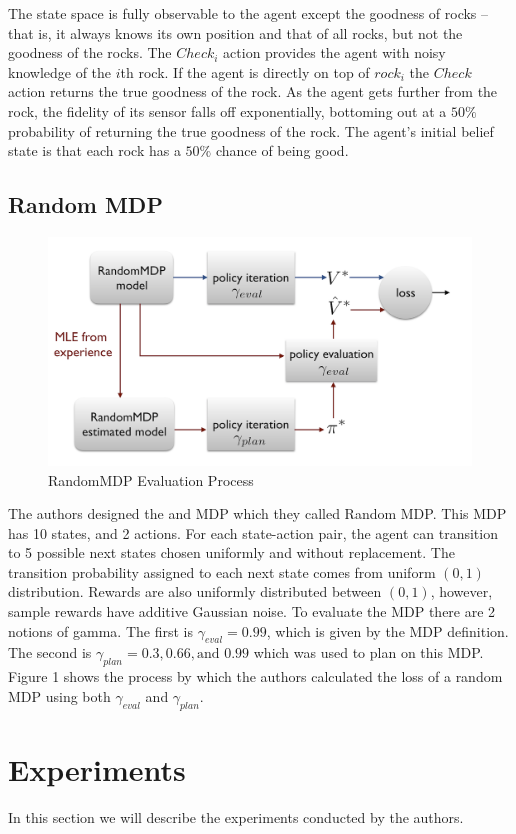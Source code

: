 \documentclass[11pt,twocolumn]{article}
\begin{document}
The state space is fully observable to the agent except the goodness of rocks -- that is, it always knows its own position and that of all rocks, but not the goodness of the rocks. The $Check_i$ action provides the agent with noisy knowledge of the $i$th rock. If the agent is directly on top of $rock_i$ the $Check$ action returns the true goodness of the rock. As the agent gets further from the rock, the fidelity of its sensor falls off exponentially, bottoming out at a $50\%$ probability of returning the true goodness of the rock. The agent's initial belief state is that each rock has a $50\%$ chance of being good.

\subsection{Random MDP}
\begin{figure}[H]
\includegraphics[page=1,width=.5\textwidth]{RandomMDPEvaluation.png}
\caption{RandomMDP Evaluation Process}
\end{figure}
The authors designed the and MDP which they called Random MDP. This MDP has 10 states, and 2 actions. 
For each state-action pair, the agent can transition to 5 possible next states chosen uniformly and without replacement.
The transition probability assigned to each next state comes from uniform $(0,1)$ distribution. Rewards are also uniformly distributed between $(0,1)$, however, sample rewards have additive Gaussian noise. To evaluate the MDP there are 2 notions of gamma. The first is $\gamma_{eval} = 0.99$, which is given by the MDP definition. The second is $\gamma_{plan} = 0.3,0.66, \text{and } 0.99$ which was used to plan on this MDP. Figure 1 shows the process by which the authors calculated the loss of a random MDP using both $\gamma_{eval}$ and $\gamma_{plan}$.



\section{Experiments}
In this section we will describe the experiments conducted by the authors.
\end{document}
